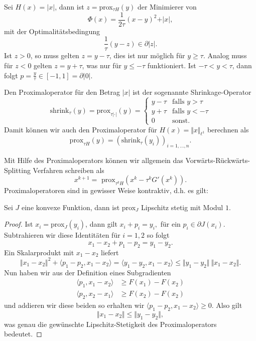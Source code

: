 \begin{example}{}{}
Sei $H(x) = \vert x \vert$, dann ist $z =$prox$_{\tau H}(y)$ der Minimierer von 
$$ \Phi(x) = \frac{1}{2\tau} (x - y)^2 + \vert x \vert, $$
mit der Optimalit\"atsbedingung 
$$ \frac{1}\tau (y-z) \in \partial \vert z\vert. $$
Ist $z > 0$, so muss gelten
$z = y - \tau$, dies ist nur m\"oglich f\"ur $y \geq \tau$. Analog muss f\"ur $z < 0$ gelten $z = y + \tau$, was nur f\"ur 
$y \leq - \tau$ funktioniert. Ist $-\tau < y < \tau$, dann folgt $p = \frac{y}\tau \in [-1,1] = \partial \vert 0 \vert. $
\end{example} 
 
Den Proximaloperator für den Betrag $\vert x \vert$ ist der sogenannte Shrinkage-Operator
$$ \text{shrink}_\tau(y) = \text{prox}_{\tau \vert \cdot \vert}(y) = \left\{ \begin{array}{ll} y - \tau & \text{falls } y > \tau \\y + \tau & \text{falls } y < - \tau  \\ 0 & \text{sonst}. \end{array}\right. $$ 
Damit k\"onnen wir auch den Proximaloperator f\"ur $H(x) = \Vert x \Vert_{\ell^1}$ berechnen als 
$$ \text{prox}_{\tau H}(y) = ( \text{shrink}_\tau(y_i))_{i=1,\ldots,n}. $$  

Mit Hilfe des Proximaloperators k\"onnen wir allgemein das Vorw\"arts-R\"uckw\"arts-Splitting Verfahren schreiben als
$$ x^{k+1} = \text{ prox}_{\tau^k H}(  x^k - \tau^k  G'(x^k) ). $$
Proximaloperatoren sind in gewisser Weise kontraktiv, d.h. es gilt:
\begin{lemma}{}{}
Sei $J$ eine konvexe Funktion, dann ist prox$_J$ Lipschitz stetig mit Modul $1$.
\end{lemma} 
\begin{proof}
Ist $x_i= $prox$_J(y_i)$, dann gilt $ x_i + p_i =  y_i, $ f\"ur ein $p_i \in \partial J(x_i)$. Subtrahieren wir diese Identit\"aten f\"ur $i=1,2$ so folgt
$$ x_1 - x_2 + p_1 - p_2 = y_1 - y_2. $$
Ein Skalarprodukt mit $x_1-x_2$ liefert
$$ \Vert x_1 - x_2 \Vert^2 + \langle p_1 - p_2, x_1-x_2 \rangle = \langle y_1 -y_2, x_1-x_2 \rangle \leq \Vert y_1-y_2 \Vert ~\Vert x_1-x_2 \Vert. $$
Nun haben wir aus der Definition eines Subgradienten
\begin{align*} \langle p_1, x_1- x_2 \rangle &\geq F(x_1) - F(x_2) \\
 \langle p_2, x_2- x_1 \rangle &\geq F(x_2) - F(x_2)  
\end{align*} 
und addieren wir diese beiden so erhalten wir $\langle p_1 - p_2, x_1-x_2 \rangle \geq 0$. Also gilt 
$$ \Vert x_1 - x_2 \Vert \leq \Vert  y_1 - y_2 \Vert , $$
was genau die gew\"unschte Lipschitz-Stetigkeit des Proximaloperators bedeutet.
\end{proof}

